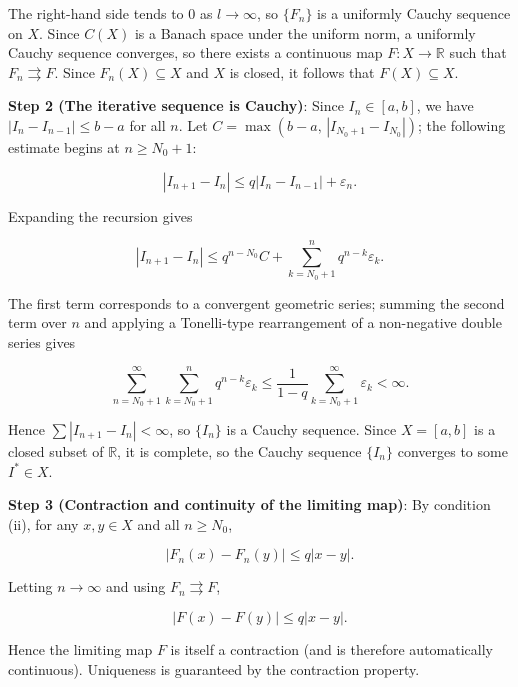 \documentclass[11pt,a4paper]{amsart}
\begin{document}
The right-hand side tends to $0$ as $l \to \infty$, so $\{F_n\}$ is a uniformly Cauchy sequence on $X$. Since $C(X)$ is a Banach space under the uniform norm, a uniformly Cauchy sequence converges, so there exists a continuous map $F: X \to \mathbb{R}$ such that $F_n \rightrightarrows F$. Since $F_n(X) \subseteq X$ and $X$ is closed, it follows that $F(X) \subseteq X$.

\textbf{Step 2 (The iterative sequence is Cauchy)}: Since $I_n \in [a,b]$, we have $|I_n - I_{n-1}| \le b-a$ for all $n$. Let $C = \max\!\left(b-a,\, |I_{N_0+1} - I_{N_0}|\right)$; the following estimate begins at $n \ge N_0+1$:

\begin{equation}
\label{eq:iter-contract}
|I_{n+1} - I_n| \le q|I_n - I_{n-1}| + \varepsilon_n.
\end{equation}

Expanding the recursion gives

\begin{equation}
|I_{n+1} - I_n| \le q^{n-N_0} C + \sum_{k=N_0+1}^{n} q^{n-k}\varepsilon_k.
\end{equation}

The first term corresponds to a convergent geometric series; summing the second term over $n$ and applying a Tonelli-type rearrangement of a non-negative double series gives

\begin{equation}
\sum_{n=N_0+1}^{\infty} \sum_{k=N_0+1}^{n} q^{n-k}\varepsilon_k \le \frac{1}{1-q} \sum_{k=N_0+1}^{\infty} \varepsilon_k < \infty.
\end{equation}

Hence $\sum |I_{n+1} - I_n| < \infty$, so $\{I_n\}$ is a Cauchy sequence. Since $X = [a,b]$ is a closed subset of $\mathbb{R}$, it is complete, so the Cauchy sequence $\{I_n\}$ converges to some $I^* \in X$.

\textbf{Step 3 (Contraction and continuity of the limiting map)}: By condition (ii), for any $x, y \in X$ and all $n \ge N_0$,

\begin{equation}
|F_n(x) - F_n(y)| \le q|x - y|.
\end{equation}

Letting $n \to \infty$ and using $F_n \rightrightarrows F$,

\begin{equation}
|F(x) - F(y)| \le q|x - y|.
\end{equation}

Hence the limiting map $F$ is itself a contraction (and is therefore automatically continuous). Uniqueness is guaranteed by the contraction property.
\end{document}
